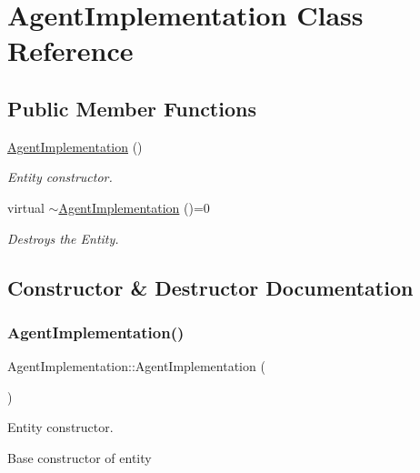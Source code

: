 \hypertarget{class_agent_implementation}{}\section{Agent\+Implementation Class Reference}
\label{class_agent_implementation}
\subsection*{Public Member Functions}
\begin{DoxyCompactItemize}
\item 
\mbox{\hyperlink{class_agent_implementation_aad8e51757c22a38b7922d8f41a8f5a51}{Agent\+Implementation}} ()
\begin{DoxyCompactList}\small\item\em Entity constructor. \end{DoxyCompactList}\item 
virtual \mbox{\hyperlink{class_agent_implementation_ae383896c0ef652632ca1967fb8490c8d}{$\sim$\+Agent\+Implementation}} ()=0
\begin{DoxyCompactList}\small\item\em Destroys the Entity. \end{DoxyCompactList}\end{DoxyCompactItemize}


\subsection{Constructor \& Destructor Documentation}
\mbox{\label{class_agent_implementation_aad8e51757c22a38b7922d8f41a8f5a51}} 
\subsubsection{\texorpdfstring{Agent\+Implementation()}{AgentImplementation()}}
{\footnotesize\ttfamily Agent\+Implementation\+::\+Agent\+Implementation (\begin{DoxyParamCaption}{ }\end{DoxyParamCaption})}



Entity constructor. 

Base constructor of entity

